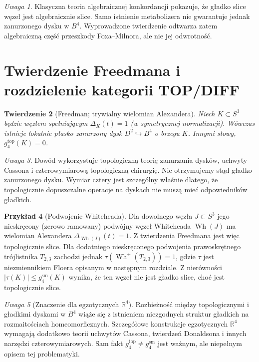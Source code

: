 \documentclass[11pt,a4paper]{report}
\numberwithin{equation}{section}
\theoremstyle{plain}
\newtheorem{twierdzenie}{Twierdzenie}[section]
\theoremstyle{definition}
\newtheorem{przyklad}[twierdzenie]{Przykład}
\theoremstyle{remark}
\newtheorem{uwaga}[twierdzenie]{Uwaga}
\begin{document}
\begin{uwaga}
Klasyczna teoria algebraicznej konkordancji pokazuje,
że gładko slice węzeł jest algebraicznie slice.
Samo istnienie metabolizera nie gwarantuje jednak
zanurzonego dysku w $B^4$. Wyprowadzone twierdzenie
odtwarza zatem algebraiczną część przeszkody Foxa--Milnora,
ale nie jej odwrotność.
\end{uwaga}


\section{Twierdzenie Freedmana i rozdzielenie kategorii TOP/DIFF}
\label{sec:kt-freedman}

\begin{twierdzenie}[Freedman; trywialny wielomian Alexandera]
Niech $K\subset S^3$ będzie węzłem spełniającym
$\Delta_K(t)=1$ (w symetrycznej normalizacji).
Wówczas istnieje lokalnie płasko zanurzony dysk
$D^2\hookrightarrow B^4$ o brzegu $K$. Innymi słowy,
$g_4^{\mathrm{top}}(K)=0$.
\end{twierdzenie}

\begin{uwaga}
Dowód wykorzystuje topologiczną teorię zanurzania dysków,
uchwyty Cassona i czterowymiarową topologiczną chirurgię.
Nie otrzymujemy stąd gładko zanurzonego dysku. Wymiar
cztery jest szczególny właśnie dlatego, że topologicznie
dopuszczalne operacje na dyskach nie muszą mieć odpowiedników
gładkich.
\end{uwaga}

\begin{przyklad}[Podwojenie Whiteheada]
Dla dowolnego węzła $J\subset S^3$ jego nieskręcony
(zerowo ramowany) podwójny węzeł Whiteheada $\operatorname{Wh}(J)$
ma wielomian Alexandera $\Delta_{\operatorname{Wh}(J)}(t)=1$.
Z twierdzenia Freedmana jest więc topologicznie slice.
Dla dodatniego nieskręconego podwojenia prawoskrętnego
trójlistnika $T_{2,3}$ zachodzi jednak
$\tau(\operatorname{Wh}^{+}(T_{2,3}))=1$,
gdzie $\tau$ jest niezmiennikiem Floera opisanym w następnym
rozdziale. Z nierówności $|\tau(K)|\leq g_4^{\mathrm{sm}}(K)$
wynika, że ten węzeł nie jest gładko slice, choć jest
topologicznie slice.
\end{przyklad}

\begin{uwaga}[Znaczenie dla egzotycznych $\mathbb R^4$]
Rozbieżność między topologicznymi i gładkimi dyskami
w $B^4$ wiąże się z istnieniem niezgodnych struktur
gładkich na rozmaitościach homeomorficznych.
Szczegółowe konstrukcje egzotycznych $\mathbb R^4$
wymagają dodatkowo teorii uchwytów Cassona, twierdzeń
Donaldsona i innych narzędzi czterowymiarowych.
Sam fakt $g_4^{\mathrm{top}}\ne g_4^{\mathrm{sm}}$
jest ważnym, ale niepełnym opisem tej problematyki.
\end{uwaga}
\end{document}
